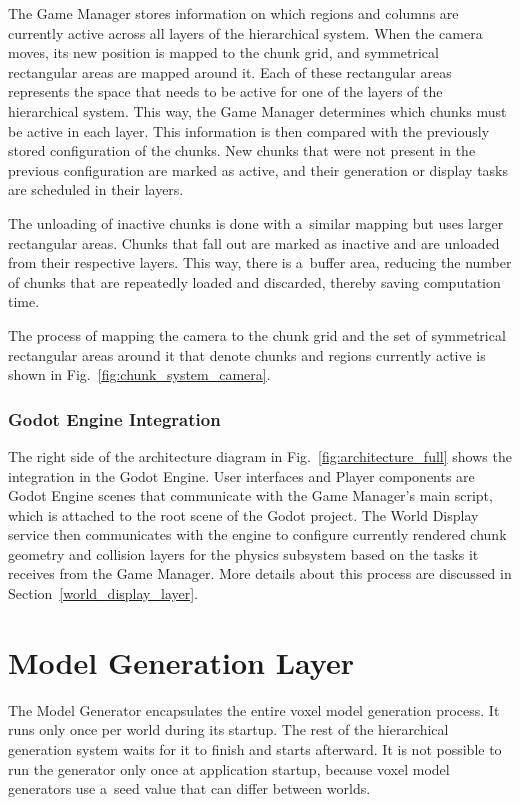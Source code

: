 The Game Manager stores information on which regions and columns are currently active across all layers of the hierarchical system. When the camera moves, its new position is mapped to the chunk grid, and symmetrical rectangular areas are mapped around it. Each of these rectangular areas represents the space that needs to be active for one of the layers of the hierarchical system. This way, the Game Manager determines which chunks must be active in each layer. This information is then compared with the previously stored configuration of the chunks. New chunks that were not present in the previous configuration are marked as active, and their generation or display tasks are scheduled in their layers.

The unloading of inactive chunks is done with a~similar mapping but uses larger rectangular areas. Chunks that fall out are marked as inactive and are unloaded from their respective layers. This way, there is a~buffer area, reducing the number of chunks that are repeatedly loaded and discarded, thereby saving computation time.

The process of mapping the camera to the chunk grid and the set of symmetrical rectangular areas around it that denote chunks and regions currently active is shown in Fig.~\ref{fig:chunk_system_camera}.

\subsubsection{Godot Engine Integration}

The right side of the architecture diagram in Fig.~\ref{fig:architecture_full} shows the integration in the Godot Engine. User interfaces and Player components are Godot Engine scenes that communicate with the Game Manager's main script, which is attached to the root scene of the Godot project. The World Display service then communicates with the engine to configure currently rendered chunk geometry and collision layers for the physics subsystem based on the tasks it receives from the Game Manager. More details about this process are discussed in Section~\ref{world_display_layer}.

\section{Model Generation Layer}

The Model Generator encapsulates the entire voxel model generation process. It runs only once per world during its startup. The rest of the hierarchical generation system waits for it to finish and starts afterward. It is not possible to run the generator only once at application startup, because voxel model generators use a~seed value that can differ between worlds.

